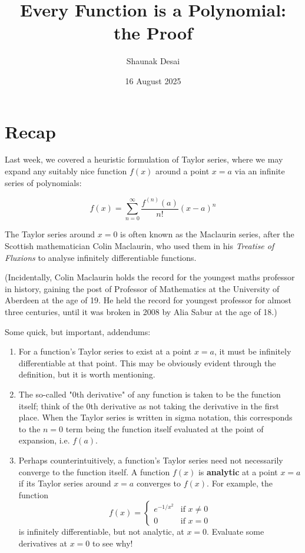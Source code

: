 \documentclass{article}
\title{Every Function is a Polynomial: the Proof}
\author{Shaunak Desai}
\date{16 August 2025}
\begin{document}
\maketitle
\section{Recap}

Last week, we covered a heuristic formulation of Taylor series, where we may expand any suitably nice function $f(x)$ around a point $x=a$ via an infinite series of polynomials:

$$
f(x) = \sum_{n=0}^{\infty} \frac{f^{(n)}(a)}{n!} (x-a)^n
$$

The Taylor series around $x=0$ is often known as the Maclaurin series, after the Scottish mathematician Colin Maclaurin, who used them in his \textit{Treatise of Fluxions} to analyse infinitely differentiable functions.

(Incidentally, Colin Maclaurin holds the record for the youngest maths professor in history, gaining the post of Professor of Mathematics at the University of Aberdeen at the age of 19. He held the record for youngest professor for almost three centuries, until it was broken in 2008 by Alia Sabur at the age of 18.)

Some quick, but important, addendums:
\begin{enumerate}
    \item For a function's Taylor series to exist at a point $x=a$, it must be infinitely differentiable at that point. This may be obviously evident through the definition, but it is worth mentioning.
    \item The so-called "0th derivative" of any function is taken to be the function itself; think of the 0th derivative as not taking the derivative in the first place. When the Taylor series is written in sigma notation, this corresponds to the $n=0$ term being the function itself evaluated at the point of expansion, i.e. $f(a)$.
    \item Perhaps counterintuitively, a function's Taylor series need not necessarily converge to the function itself. A function $f(x)$ is \textbf{analytic} at a point $x=a$ if its Taylor series around $x=a$ converges to $f(x)$. For example, the function
    $$
    f(x) =
    \begin{cases}
    e^{-1/x^2} & \text{if } x \neq 0 \\
    0 & \text{if } x = 0
    \end{cases}
    $$
    is infinitely differentiable, but not analytic, at $x=0$. Evaluate some derivatives at $x=0$ to see why!
\end{enumerate}
\end{document}
